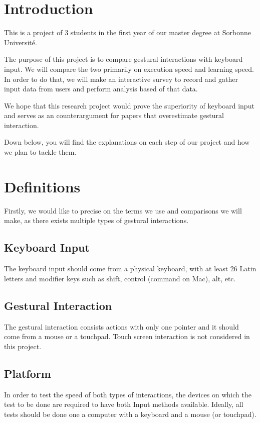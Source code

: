 \documentclass[12pt]{article}
\begin{document}
\section{Introduction}
This is a project of 3 students in the first year of our master degree at Sorbonne Université.

The purpose of this project is to compare gestural interactions with keyboard input. We will compare the two primarily on execution speed and learning speed. In order to do that, we will make an interactive survey to record and gather input data from users and perform analysis based of that data. 

We hope that this research project would prove the superiority of keyboard input and serves as an counterargument for papers that overestimate gestural interaction.

Down below, you will find the explanations on each step of our project and how we plan to tackle them.

\section{Definitions}
Firstly, we would like to precise on the terms we use and comparisons we will make, as there exists multiple types of gestural interactions. 

\subsection{Keyboard Input}
The keyboard input should come from a physical keyboard, with at least 26 Latin letters and modifier keys such as shift, control (command on Mac), alt, etc.

\subsection{Gestural Interaction}
The gestural interaction consists actions with only one pointer and it should come from a mouse or a touchpad. Touch screen interaction is not considered in this project.

\subsection{Platform}
In order to test the speed of both types of interactions, the devices on which the test to be done are required to have both Input methods available. Ideally, all tests should be done one a computer with a keyboard and a mouse (or touchpad).
\end{document}
